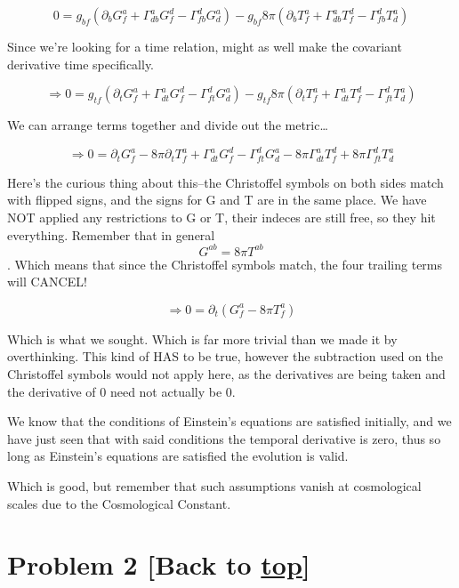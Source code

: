 \documentclass[landscape,letterpaper,10pt,english]{article}
\begin{document}
    \[ 0 = g_{bf}\left(\partial_bG^{a}_f+\Gamma^a_{db}G^{d}_f-\Gamma^d_{fb}G^{a}_d\right) - g_{bf}8\pi \left(\partial_bT^{a}_f+\Gamma^a_{db}T^{d}_f-\Gamma^d_{fb}T^{a}_d\right) \]

Since we're looking for a time relation, might as well make the
covariant derivative time specifically.

\[ \Rightarrow 0 = g_{tf}\left(\partial_tG^{a}_f+\Gamma^a_{dt}G^{d}_f-\Gamma^d_{ft}G^{a}_d\right) - g_{tf}8\pi \left(\partial_tT^{a}_f+\Gamma^a_{dt}T^{d}_f-\Gamma^d_{ft}T^{a}_d\right) \]

We can arrange terms together and divide out the metric\ldots{}

\[ \Rightarrow 0 = \partial_tG^{a}_f - 8\pi\partial_tT^{a}_f+\Gamma^a_{dt}G^{d}_f-\Gamma^d_{ft}G^{a}_d-8\pi\Gamma^a_{dt}T^{d}_f+8\pi\Gamma^d_{ft}T^{a}_d \]

    Here's the curious thing about this--the Christoffel symbols on both
sides match with flipped signs, and the signs for G and T are in the
same place. We have NOT applied any restrictions to G or T, their
indeces are still free, so they hit everything. Remember that in general
\[G^{ab} = 8\pi T^{ab}\]. Which means that since the Christoffel symbols
match, the four trailing terms will CANCEL!

\[ \Rightarrow 0 = \partial_t(G^{a}_f - 8\pi T^{a}_f ) \]

Which is what we sought. Which is far more trivial than we made it by
overthinking. This kind of HAS to be true, however the subtraction used
on the Christoffel symbols would not apply here, as the derivatives are
being taken and the derivative of 0 need not actually be 0.

We know that the conditions of Einstein's equations are satisfied
initially, and we have just seen that with said conditions the temporal
derivative is zero, thus so long as Einstein's equations are satisfied
the evolution is valid.

Which is good, but remember that such assumptions vanish at cosmological
scales due to the Cosmological Constant.

    \hypertarget{problem-2-back-to-top}{%
\section{\texorpdfstring{Problem 2 {[}Back to
\hyperref[toc]{top}{]}}{Problem 2 {[}Back to {]}}}\label{problem-2-back-to-top}}

\[\label{P2}\]
\end{document}
